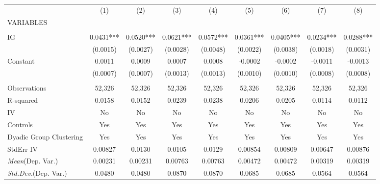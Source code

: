 \documentclass[]{article}
\begin{document}
\begin{tabular}{lcccccccc} \hline
 & (1) & (2) & (3) & (4) & (5) & (6) & (7) & (8) \\
VARIABLES &  &  &  &  &  &  &  &  \\ \hline
 &  &  &  &  &  &  &  &  \\
IG & 0.0431*** & 0.0520*** & 0.0621*** & 0.0572*** & 0.0361*** & 0.0405*** & 0.0234*** & 0.0288*** \\
 & (0.0015) & (0.0027) & (0.0028) & (0.0048) & (0.0022) & (0.0038) & (0.0018) & (0.0031) \\
Constant & 0.0011 & 0.0009 & 0.0007 & 0.0008 & -0.0002 & -0.0002 & -0.0011 & -0.0013 \\
 & (0.0007) & (0.0007) & (0.0013) & (0.0013) & (0.0010) & (0.0010) & (0.0008) & (0.0008) \\
 &  &  &  &  &  &  &  &  \\
Observations & 52,326 & 52,326 & 52,326 & 52,326 & 52,326 & 52,326 & 52,326 & 52,326 \\
R-squared & 0.0158 & 0.0152 & 0.0239 & 0.0238 & 0.0206 & 0.0205 & 0.0114 & 0.0112 \\
IV & No & No & No & No & No & No & No & No \\
Controls & Yes & Yes & Yes & Yes & Yes & Yes & Yes & Yes \\
Dyadic Group Clustering & Yes & Yes & Yes & Yes & Yes & Yes & Yes & Yes \\
StdErr IV & 0.00827 & 0.0130 & 0.0105 & 0.0129 & 0.00854 & 0.00809 & 0.00647 & 0.00876 \\
\textit{Mean}(Dep. Var.) & 0.00231 & 0.00231 & 0.00763 & 0.00763 & 0.00472 & 0.00472 & 0.00319 & 0.00319 \\
 \textit{Std.Dev.}(Dep. Var.) & 0.0480 & 0.0480 & 0.0870 & 0.0870 & 0.0685 & 0.0685 & 0.0564 & 0.0564 \\ \hline
\end{tabular}
\end{document}

